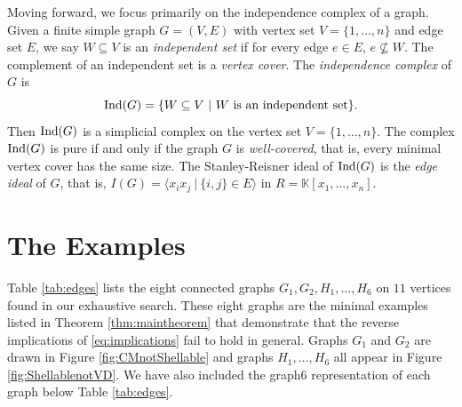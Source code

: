 \documentclass[12pt]{amsart}
\theoremstyle{plain}
\theoremstyle{definition}
\theoremstyle{remark}
\numberwithin{equation}{section}
\numberwithin{equation}{section}
\begin{document}
Moving forward, we focus primarily on the independence complex of a graph.
Given a finite simple graph $G = (V,E)$ with vertex set $V = \{1,\ldots,n\}$
and edge set $E$, we say $W \subseteq V$ is an {\it independent set} if
for every edge $e \in E$, $e \not\subseteq W$.  The complement 
of an independent set is a {\it vertex cover}.  The {\it 
independence complex} of $G$ is
$${\rm Ind}(G) = \{W \subseteq V ~|~ \mbox{$W$ is an independent set}\}.$$
Then ${\rm Ind}(G)$ is a simplicial complex on the vertex set $V = \{1,\ldots,n\}$.  The complex ${\rm Ind}(G)$ is pure  if and only if 
the graph $G$ is {\it well-covered}, that is, every minimal vertex
cover has the same size. The Stanley-Reisner ideal of ${\rm Ind}(G)$ is the 
{\it edge ideal} of $G$, that is, $I(G) = \langle x_ix_j ~|~ \{i,j\} \in E \rangle$ in $R = \mathbb{K}[x_1,\ldots,x_n]$.  


\section{The Examples}\label{sec:examples}

Table \ref{tab:edges} lists the eight 
connected graphs $G_1, G_2,H_1,\ldots,H_6$ on $11$ vertices
found in our exhaustive search.  These 
eight graphs are the minimal examples listed in Theorem \ref{thm:maintheorem} that demonstrate that the 
reverse implications of \eqref{eq:implications}
fail to hold in general.  Graphs $G_1$ and $G_2$ are 
drawn in Figure \ref{fig:CMnotShellable} and graphs
$H_1,\ldots,H_6$ all appear in Figure \ref{fig:ShellablenotVD}.  
We have also included the graph6 representation of each
graph below Table \ref{tab:edges}.
\end{document}
